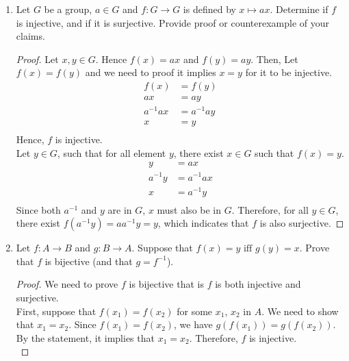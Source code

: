 \documentclass[12pt]{article}
\begin{document}
    \begin{enumerate}
 \item Let $G$ be a group, $a\in G$ and $f: G\to G$ is defined by $x\mapsto ax$. Determine if $f$ is injective, and if it is surjective. Provide proof or counterexample of your claims.

 \begin{proof}
    Let $x,y \in G$. Hence $f(x) = ax$ and $f(y) = ay$. Then, Let $f(x) = f(y)$ and we need to proof it implies $x=y$ for it to be injective.
    \begin{align*}
        f(x) &= f(y) \\
        ax &= ay \\
        a^{-1}ax & = a^{-1}ay\\ 
        x&= y\\
    \end{align*}
    Hence, $f$ is injective.\\
    Let $y \in G$, such that for all element $y$, there exist $x\in G$ such that $f(x) = y$.
    \begin{align*}
        y&= ax\\
        a^{-1}y &=  a^{-1}ax\\
        x &= a^{-1}y \\
    \end{align*}
    Since both $a^{-1}$ and $y$ are in $G$, $x$ must also be in $G$. Therefore, for all $y \in G$, there exist $f(a^{-1}y) = aa^{-1}y = y$, which indicates that $f$ is also surjective.

 \end{proof}
        \item Let $f: A\to B$ and $g: B\to A$. Suppose that $f(x) = y \text{ iff } g(y) = x$. Prove that $f$ is bijective (and that $g = f^{−1}$).
     \begin{proof}
        We need to prove $f$ is bijective that is $f$ is both injective and surjective.\\
        First, suppose that $f(x_1) = f(x_2)$ for some $x_1$, $x_2$ in $A$. We need to show that $x_1 = x_2$.
        Since $f(x_1) = f(x_2)$, we have $g(f(x_1)) = g(f(x_2))$. By the statement, it implies that $x_1 = x_2$. Therefore, $f$ is injective.\\


\end{proof}
\end{enumerate}
\end{document}
